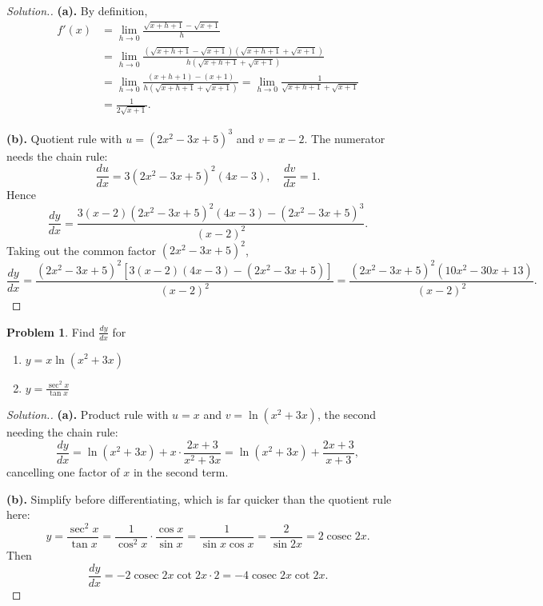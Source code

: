 \documentclass[11pt,a4paper]{article}
\theoremstyle{definition}
\newtheorem{problemx}{Problem}[section]
\newenvironment{problem}{\begin{problemx}}{\end{problemx}}
\newenvironment{solution}
  {\renewcommand{\qedsymbol}{}\begin{proof}[\textit{Solution}.]}
  {\end{proof}}
\begin{document}
\begin{solution}
\textbf{(a).} By definition,
\begin{align*}
f'(x)&=\lim_{h\to 0}\frac{\sqrt{x+h+1}-\sqrt{x+1}}{h}\\
     &=\lim_{h\to 0}\frac{\left(\sqrt{x+h+1}-\sqrt{x+1}\right)
                          \left(\sqrt{x+h+1}+\sqrt{x+1}\right)}
                         {h\left(\sqrt{x+h+1}+\sqrt{x+1}\right)}\\
     &=\lim_{h\to 0}\frac{(x+h+1)-(x+1)}{h\left(\sqrt{x+h+1}+\sqrt{x+1}\right)}
      =\lim_{h\to 0}\frac{1}{\sqrt{x+h+1}+\sqrt{x+1}}\\
     &=\frac{1}{2\sqrt{x+1}} .
\end{align*}

\textbf{(b).} Quotient rule with $u=\left(2x^{2}-3x+5\right)^{3}$ and $v=x-2$. The
numerator needs the chain rule:
$$\frac{du}{dx}=3\left(2x^{2}-3x+5\right)^{2}(4x-3),\quad \frac{dv}{dx}=1 .$$
Hence
$$\frac{dy}{dx}
=\frac{3(x-2)\left(2x^{2}-3x+5\right)^{2}(4x-3)-\left(2x^{2}-3x+5\right)^{3}}
      {(x-2)^{2}} .$$
Taking out the common factor $\left(2x^{2}-3x+5\right)^{2}$,
$$\frac{dy}{dx}=\frac{\left(2x^{2}-3x+5\right)^{2}
\left[3(x-2)(4x-3)-\left(2x^{2}-3x+5\right)\right]}{(x-2)^{2}}
=\frac{\left(2x^{2}-3x+5\right)^{2}\left(10x^{2}-30x+13\right)}{(x-2)^{2}} .$$
\end{solution}

\pagebreak

\begin{problem}
Find $\frac{dy}{dx}$ for
\begin{enumerate}
\item[(a).] $y=x\ln\left(x^{2}+3x\right)$
\item[(b).] $y=\frac{\sec^{2}x}{\tan x}$
\end{enumerate}
\end{problem}

\begin{solution}
\textbf{(a).} Product rule with $u=x$ and $v=\ln\left(x^{2}+3x\right)$, the second
needing the chain rule:
$$\frac{dy}{dx}=\ln\left(x^{2}+3x\right)+x\cdot\frac{2x+3}{x^{2}+3x}
=\ln\left(x^{2}+3x\right)+\frac{2x+3}{x+3},$$
cancelling one factor of $x$ in the second term.

\textbf{(b).} Simplify before differentiating, which is far quicker than the
quotient rule here:
$$y=\frac{\sec^{2}x}{\tan x}
=\frac{1}{\cos^{2}x}\cdot\frac{\cos x}{\sin x}
=\frac{1}{\sin x\cos x}=\frac{2}{\sin 2x}=2\operatorname{cosec}2x .$$
Then
$$\frac{dy}{dx}=-2\operatorname{cosec}2x\cot 2x\cdot 2
=-4\operatorname{cosec}2x\cot 2x .$$
\end{solution}
\end{document}
